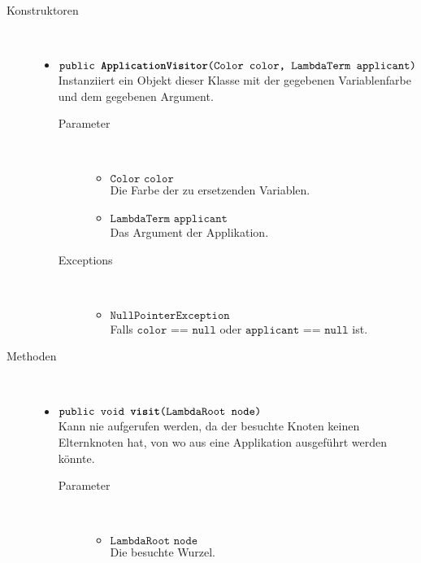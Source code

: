 \begin{description}
\item[Konstruktoren] \hfill \\
	\vspace{-.8cm}
	\begin{itemize}
		\item $\texttt{public \textbf{ApplicationVisitor}(Color color, LambdaTerm applicant)}$ \\ Instanziiert ein Objekt dieser Klasse mit der gegebenen Variablenfarbe und dem gegebenen Argument.
		\begin{description}
			\item[Parameter] \hfill \\
			\vspace{-.8cm}
			\begin{itemize}
				\item $\texttt{Color color}$ \\ Die Farbe der zu ersetzenden Variablen.
				\item $\texttt{LambdaTerm applicant}$ \\ Das Argument der Applikation.
			\end{itemize}
			\item[Exceptions] \hfill \\
			\vspace{-.8cm}
			\begin{itemize}
				\item $\texttt{NullPointerException}$ \\ Falls $\texttt{color == null}$ oder $\texttt{applicant == null}$ ist.
			\end{itemize}
		\end{description}
	\end{itemize}

\item[Methoden] \hfill \\
	\vspace{-.8cm}
	\begin{itemize}
		\item $\texttt{public void \textbf{visit}(LambdaRoot node)}$ \\ Kann nie aufgerufen werden, da der besuchte Knoten keinen Elternknoten hat, von wo aus eine Applikation ausgeführt werden könnte.
		\begin{description}
			\item[Parameter] \hfill \\
			\vspace{-.8cm}
			\begin{itemize}
				\item $\texttt{LambdaRoot node}$ \\ Die besuchte Wurzel.
			\end{itemize}
		\end{description}
				

\end{itemize}
\end{description}
